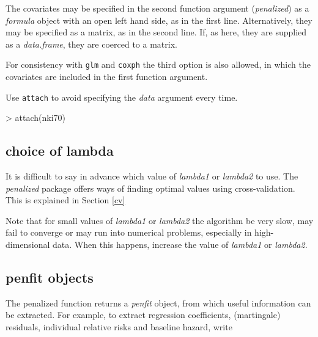 \documentclass[a4paper]{article}
\newcommand{\Rfunction}[1]{{\texttt{#1}}}
\newcommand{\Rpackage}[1]{{\textit{#1}}}
\newcommand{\Rclass}[1]{{\textit{#1}}}
\newcommand{\Rfunarg}[1]{{\textit{#1}}}
\begin{document}
The covariates may be specified in the second function argument (\Rfunarg{penalized}) as a \Rclass{formula} object with an open left hand side, as in the first line. Alternatively, they may be specified as a matrix, as in the second line. If, as here, they are supplied as a \Rclass{data.frame}, they are coerced to a matrix.

For consistency with \Rfunction{glm} and \Rfunction{coxph} the third option is also allowed, in which the covariates are included in the first function argument.

Use \Rfunction{attach} to avoid specifying the \Rfunarg{data} argument every time.

\begin{Schunk}
\begin{Sinput}
> attach(nki70)
\end{Sinput}
\end{Schunk}

\subsection{choice of lambda}

It is difficult to say in advance which value of \Rfunarg{lambda1} or \Rfunarg{lambda2} to use. The \Rpackage{penalized} package offers ways of finding optimal values using cross-validation. This is explained in Section \ref{cv}

Note that for small values of \Rfunarg{lambda1} or \Rfunarg{lambda2} the algorithm be very slow, may fail to converge or may run into numerical problems, especially in high-dimensional data. When this happens, increase the value of \Rfunarg{lambda1} or \Rfunarg{lambda2}.


\subsection{penfit objects}

The penalized function returns a \Rclass{penfit} object, from which useful information can be extracted. For example, to extract regression coefficients, (martingale) residuals, individual relative risks and baseline hazard, write
\end{document}

